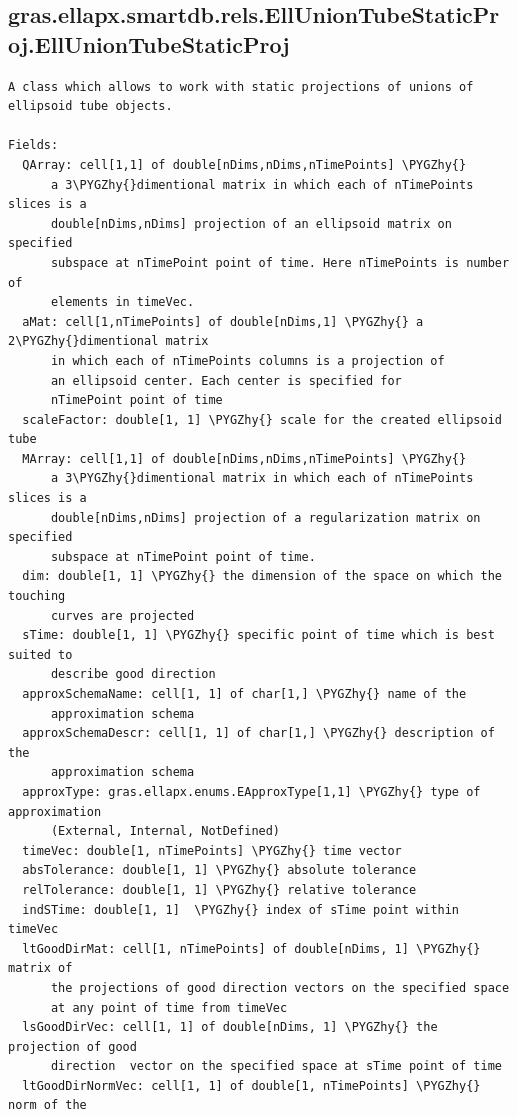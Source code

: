 \documentclass[letterpaper,10pt,english]{sphinxmanual}
\def\PYGZhy{\char`\-}
\begin{document}
\subsection{gras.ellapx.smartdb.rels.EllUnionTubeStaticProj.EllUnionTubeStaticProj}
\label{chap_functions:gras-ellapx-smartdb-rels-elluniontubestaticproj-elluniontubestaticproj}
\begin{Verbatim}[commandchars=\\\{\}]
A class which allows to work with static projections of unions of
ellipsoid tube objects.

Fields:
  QArray: cell[1,1] of double[nDims,nDims,nTimePoints] \PYGZhy{}
      a 3\PYGZhy{}dimentional matrix in which each of nTimePoints slices is a
      double[nDims,nDims] projection of an ellipsoid matrix on specified
      subspace at nTimePoint point of time. Here nTimePoints is number of
      elements in timeVec.
  aMat: cell[1,nTimePoints] of double[nDims,1] \PYGZhy{} a 2\PYGZhy{}dimentional matrix
      in which each of nTimePoints columns is a projection of
      an ellipsoid center. Each center is specified for
      nTimePoint point of time
  scaleFactor: double[1, 1] \PYGZhy{} scale for the created ellipsoid tube
  MArray: cell[1,1] of double[nDims,nDims,nTimePoints] \PYGZhy{}
      a 3\PYGZhy{}dimentional matrix in which each of nTimePoints slices is a
      double[nDims,nDims] projection of a regularization matrix on specified
      subspace at nTimePoint point of time.
  dim: double[1, 1] \PYGZhy{} the dimension of the space on which the touching
      curves are projected
  sTime: double[1, 1] \PYGZhy{} specific point of time which is best suited to
      describe good direction
  approxSchemaName: cell[1, 1] of char[1,] \PYGZhy{} name of the
      approximation schema
  approxSchemaDescr: cell[1, 1] of char[1,] \PYGZhy{} description of the
      approximation schema
  approxType: gras.ellapx.enums.EApproxType[1,1] \PYGZhy{} type of approximation
      (External, Internal, NotDefined)
  timeVec: double[1, nTimePoints] \PYGZhy{} time vector
  absTolerance: double[1, 1] \PYGZhy{} absolute tolerance
  relTolerance: double[1, 1] \PYGZhy{} relative tolerance
  indSTime: double[1, 1]  \PYGZhy{} index of sTime point within timeVec
  ltGoodDirMat: cell[1, nTimePoints] of double[nDims, 1] \PYGZhy{} matrix of
      the projections of good direction vectors on the specified space
      at any point of time from timeVec
  lsGoodDirVec: cell[1, 1] of double[nDims, 1] \PYGZhy{} the projection of good
      direction  vector on the specified space at sTime point of time
  ltGoodDirNormVec: cell[1, 1] of double[1, nTimePoints] \PYGZhy{} norm of the

\end{Verbatim}
\end{document}
